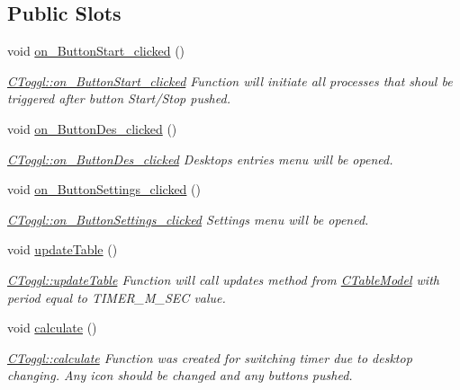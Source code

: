 \subsection*{Public Slots}
\begin{DoxyCompactItemize}
\item 
void \hyperlink{classCToggl_a110c1e91012e0ce77c4d5df0b8dad9f1}{on\+\_\+\+Button\+Start\+\_\+clicked} ()
\begin{DoxyCompactList}\small\item\em \hyperlink{classCToggl_a110c1e91012e0ce77c4d5df0b8dad9f1}{C\+Toggl\+::on\+\_\+\+Button\+Start\+\_\+clicked} Function will initiate all processes that shoul be triggered after button Start/\+Stop pushed. \end{DoxyCompactList}\item 
\mbox{\label{classCToggl_a660325b24c851788649f0df06729fcf5}} 
void \hyperlink{classCToggl_a660325b24c851788649f0df06729fcf5}{on\+\_\+\+Button\+Des\+\_\+clicked} ()
\begin{DoxyCompactList}\small\item\em \hyperlink{classCToggl_a660325b24c851788649f0df06729fcf5}{C\+Toggl\+::on\+\_\+\+Button\+Des\+\_\+clicked} Desktop\textquotesingle{}s entries menu will be opened. \end{DoxyCompactList}\item 
\mbox{\label{classCToggl_a9d85700c7ec8c92b50ebd932d4b44dd1}} 
void \hyperlink{classCToggl_a9d85700c7ec8c92b50ebd932d4b44dd1}{on\+\_\+\+Button\+Settings\+\_\+clicked} ()
\begin{DoxyCompactList}\small\item\em \hyperlink{classCToggl_a9d85700c7ec8c92b50ebd932d4b44dd1}{C\+Toggl\+::on\+\_\+\+Button\+Settings\+\_\+clicked} Settings menu will be opened. \end{DoxyCompactList}\item 
\mbox{\label{classCToggl_aaf46382c748a6c28e25c434ff7e82c64}} 
void \hyperlink{classCToggl_aaf46382c748a6c28e25c434ff7e82c64}{update\+Table} ()
\begin{DoxyCompactList}\small\item\em \hyperlink{classCToggl_aaf46382c748a6c28e25c434ff7e82c64}{C\+Toggl\+::update\+Table} Function will call updates method from \hyperlink{classCTableModel}{C\+Table\+Model} with period equal to T\+I\+M\+E\+R\+\_\+\+M\+\_\+\+S\+EC value. \end{DoxyCompactList}\item 
\mbox{\label{classCToggl_acbc2868125a67897c26f41f98afa4920}} 
void \hyperlink{classCToggl_acbc2868125a67897c26f41f98afa4920}{calculate} ()
\begin{DoxyCompactList}\small\item\em \hyperlink{classCToggl_acbc2868125a67897c26f41f98afa4920}{C\+Toggl\+::calculate} Function was created for switching timer due to desktop changing. Any icon should be changed and any buttons pushed. \end{DoxyCompactList}\end{DoxyCompactItemize}
